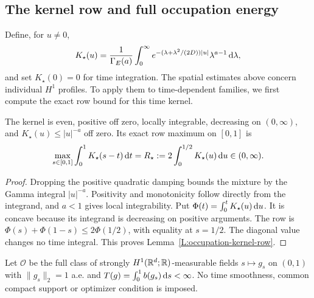 \subsection{The kernel row and full occupation energy}

Define, for $u \ne 0$,
\begin{equation}\label{E:occupation-damped-kernel}
  K_\star(u)=\frac1{\Gamma_E(a)}
  \int_0^\infty
  e^{-(\lambda+\lambda^2/(2D))|u|}
  \lambda^{a-1}\,\mathrm{d}\lambda,
\end{equation}
and set $K_\star(0) = 0$ for time integration. The spatial estimates above
concern individual $H^1$ profiles. To apply them to time-dependent families,
we first compute the exact row bound for this time kernel.

\begin{lemma}\label{L:occupation-kernel-row}
  The kernel is even, positive off zero, locally integrable, decreasing on
  $(0,\infty)$, and $K_\star(u) \le |u|^{-a}$ off zero. Its exact row maximum on
  $[0,1]$ is
  \begin{equation}\label{E:occupation-kernel-row}
    \max_{s\in[0,1]}\int_0^1K_\star(s-t)\,\mathrm{d} t
    =R_\star:=2\int_0^{1/2}K_\star(u)\,\mathrm{d} u\in(0,\infty).
  \end{equation}
\end{lemma}

\begin{proof}
  Dropping the positive quadratic damping bounds the mixture by the Gamma
  integral $|u|^{-a}$. Positivity and monotonicity follow directly from the
  integrand, and $a < 1$ gives local integrability. Put $\Phi(t) =
  \int_0^tK_\star(u)\,\mathrm{d} u$. It is concave because its integrand is decreasing on
  positive arguments. The row is $\Phi(s)+\Phi(1-s) \le 2\Phi(1/2)$, with
  equality at $s = 1/2$. The diagonal value changes no time integral. This
  proves Lemma~\ref{L:occupation-kernel-row}.
\end{proof}

Let $\mathcal{O}$ be the full class of strongly $H^1(\mathbb{R}^d;\mathbb{R})$-measurable fields
$s\mapsto g_s$ on $(0,1)$ with $\|g_s\|_2 = 1$ a.e. and $T(g) =
\int_0^1b(g_s)\,\mathrm{d} s < \infty$. No time smoothness, common compact support or
optimizer condition is imposed.

